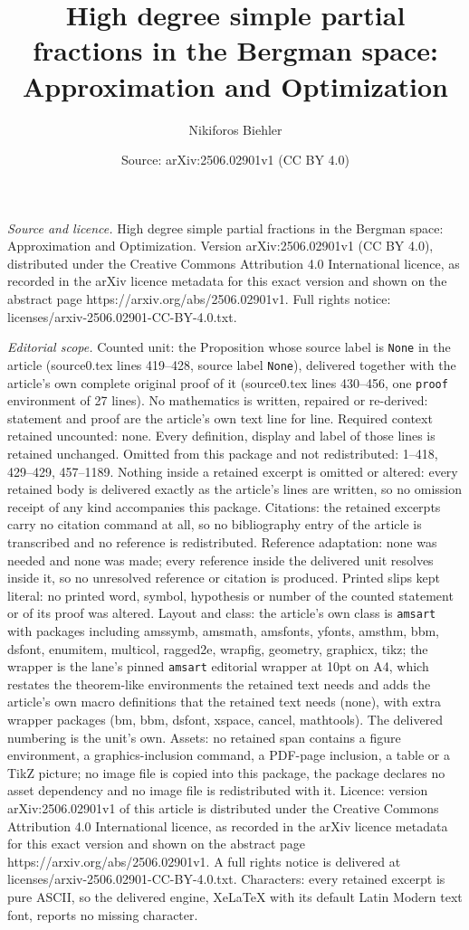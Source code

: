 \documentclass[10pt,a4paper]{amsart}
\title[High degree simple partial fractions in the Bergman space: A]{High degree simple partial fractions in the Bergman space: Approximation and Optimization}
\author{Nikiforos Biehler}
\date{Source: arXiv:2506.02901v1 (CC BY 4.0)}
\begin{document}
\maketitle

\noindent\emph{Source and licence.} High degree simple partial fractions in the Bergman space: Approximation and Optimization. Version arXiv:2506.02901v1 (CC BY 4.0), distributed under the Creative Commons Attribution 4.0 International licence, as recorded in the arXiv licence metadata for this exact version and shown on the abstract page https://arxiv.org/abs/2506.02901v1. Full rights notice: licenses/arxiv-2506.02901-CC-BY-4.0.txt.\par\smallskip

\noindent\textit{Editorial scope.} Counted unit: the Proposition whose source label is \texttt{None} in the article (source0.tex lines 419--428, source label \texttt{None}), delivered together with the article's own complete original proof of it (source0.tex lines 430--456, one \texttt{proof} environment of 27 lines). No mathematics is written, repaired or re-derived: statement and proof are the article's own text line for line. Required context retained uncounted: none. Every definition, display and label of those lines is retained unchanged. Omitted from this package and not redistributed: 1--418, 429--429, 457--1189. Nothing inside a retained excerpt is omitted or altered: every retained body is delivered exactly as the article's lines are written, so no omission receipt of any kind accompanies this package. Citations: the retained excerpts carry no citation command at all, so no bibliography entry of the article is transcribed and no reference is redistributed. Reference adaptation: none was needed and none was made; every reference inside the delivered unit resolves inside it, so no unresolved reference or citation is produced. Printed slips kept literal: no printed word, symbol, hypothesis or number of the counted statement or of its proof was altered. Layout and class: the article's own class is \texttt{amsart} with packages including amssymb, amsmath, amsfonts, yfonts, amsthm, bbm, dsfont, enumitem, multicol, ragged2e, wrapfig, geometry, graphicx, tikz; the wrapper is the lane's pinned \texttt{amsart} editorial wrapper at 10pt on A4, which restates the theorem-like environments the retained text needs and adds the article's own macro definitions that the retained text needs (none), with extra wrapper packages (bm, bbm, dsfont, xspace, cancel, mathtools). The delivered numbering is the unit's own. Assets: no retained span contains a figure environment, a graphics-inclusion command, a PDF-page inclusion, a table or a TikZ picture; no image file is copied into this package, the package declares no asset dependency and no image file is redistributed with it. Licence: version arXiv:2506.02901v1 of this article is distributed under the Creative Commons Attribution 4.0 International licence, as recorded in the arXiv licence metadata for this exact version and shown on the abstract page https://arxiv.org/abs/2506.02901v1. A full rights notice is delivered at licenses/arxiv-2506.02901-CC-BY-4.0.txt. Characters: every retained excerpt is pure ASCII, so the delivered engine, XeLaTeX with its default Latin Modern text font, reports no missing character.
\end{document}
